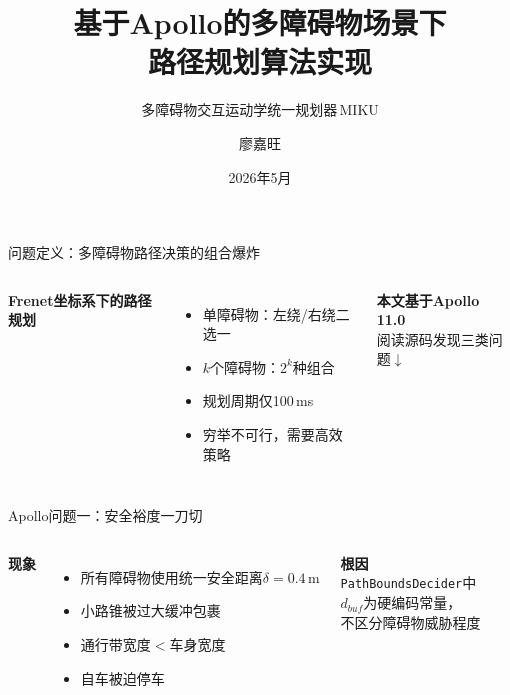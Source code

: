 \documentclass[aspectratio=169,10pt,fontset=none]{ctexbeamer}
\title[基于Apollo的多障碍物场景下路径规划算法实现]{基于Apollo的多障碍物场景下\\路径规划算法实现}
\subtitle{多障碍物交互运动学统一规划器\,MIKU}
\author[廖嘉旺]{廖嘉旺}
\institute[湖北文理学院]{湖北文理学院\quad{}计算机工程学院\quad{}计科2211\\[2pt]\textbf{指导教师}\quad{}孙成娇\ 老师}
\date{2026年5月}
\begin{document}
\begin{frame}
  \titlepage
\end{frame}

\begin{frame}{问题定义：多障碍物路径决策的组合爆炸}
\begin{columns}[T,onlytextwidth]
  \centering
  \small
  \textbf{Frenet坐标系下的路径规划}
  \begin{itemize}\setlength\itemsep{4pt}
    \item 单障碍物：左绕/右绕二选一
    \item $k$个障碍物：$2^k$种组合
    \item 规划周期仅100\,ms
    \item 穷举不可行，需要高效策略
  \end{itemize}
  \vspace{0.5em}
  \textbf{本文基于Apollo 11.0}\\
  阅读源码发现三类问题$\downarrow$
\end{columns}
\end{frame}

\begin{frame}{Apollo问题一：安全裕度一刀切}
\begin{columns}[T,onlytextwidth]
  \centering
  \small
  \textbf{现象}
  \begin{itemize}\setlength\itemsep{3pt}
    \item 所有障碍物使用统一安全距离$\delta=0.4$\,m
    \item 小路锥被过大缓冲包裹
    \item 通行带宽度$<$车身宽度
    \item 自车被迫停车
  \end{itemize}
  \vspace{0.4em}
  \textbf{根因}\\
  \texttt{PathBoundsDecider}中\\$d_{buf}$为硬编码常量，\\不区分障碍物威胁程度
\end{columns}
\end{frame}
\end{document}
